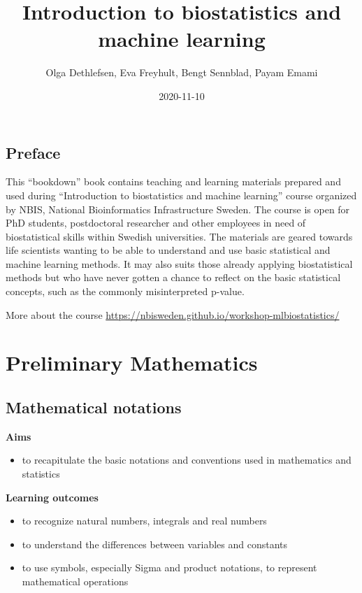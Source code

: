\documentclass[
]{book}
\title{Introduction to biostatistics and machine learning}
\author{Olga Dethlefsen, Eva Freyhult, Bengt Sennblad, Payam Emami}
\date{2020-11-10}
\providecommand{\tightlist}{%
  \setlength{\itemsep}{0pt}\setlength{\parskip}{0pt}}
\theoremstyle{definition}
\theoremstyle{definition}
\theoremstyle{definition}
\theoremstyle{remark}
\begin{document}
\maketitle

{
\setcounter{tocdepth}{1}
\tableofcontents
}
\hypertarget{preface}{%
\chapter*{Preface}\label{preface}}

This ``bookdown'' book contains teaching and learning materials prepared and used during ``Introduction to biostatistics and machine learning'' course organized by NBIS, National Bioinformatics Infrastructure Sweden. The course is open for PhD students, postdoctoral researcher and other employees in need of biostatistical skills within Swedish universities. The materials are geared towards life scientists wanting to be able to understand and use basic statistical and machine learning methods. It may also suits those already applying biostatistical methods but who have never gotten a chance to reflect on the basic statistical concepts, such as the commonly misinterpreted p-value.

More about the course \url{https://nbisweden.github.io/workshop-mlbiostatistics/}

\hypertarget{part-preliminary-mathematics}{%
\part{Preliminary Mathematics}\label{part-preliminary-mathematics}}

\hypertarget{mathematical-notations}{%
\chapter{Mathematical notations}\label{mathematical-notations}}

\textbf{Aims}

\begin{itemize}
\tightlist
\item
  to recapitulate the basic notations and conventions used in mathematics and statistics
\end{itemize}

\textbf{Learning outcomes}

\begin{itemize}
\tightlist
\item
  to recognize natural numbers, integrals and real numbers
\item
  to understand the differences between variables and constants
\item
  to use symbols, especially Sigma and product notations, to represent mathematical operations
\end{itemize}
\end{document}
